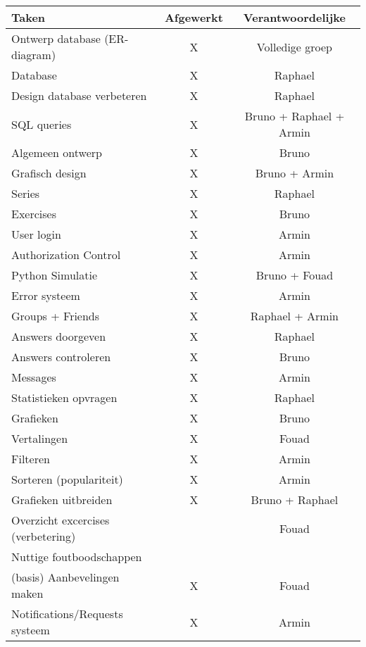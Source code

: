 \begin{tabular}{| l | c | c |}
    \hline
    Taken   &   Afgewerkt   &   Verantwoordelijke \\
    \hline \hline
    Ontwerp database (ER-diagram)   &   X   &   Volledige groep \\
    Database                &   X   &   Raphael \\
    Design database verbeteren  &   X   &   Raphael \\
    SQL queries             &   X   &   Bruno + Raphael + Armin \\
    Algemeen ontwerp        &   X   &   Bruno   \\
    Grafisch design         &   X   &   Bruno + Armin  \\
    Series                  &   X   &   Raphael \\
    Exercises              &   X   &   Bruno   \\
    User login              &   X   &   Armin   \\
    Authorization Control   &   X   &   Armin   \\
    Python Simulatie        &   X   &   Bruno + Fouad   \\
    Error systeem           &   X   &   Armin \\
    Groups + Friends        &   X   &   Raphael + Armin    \\
    Answers doorgeven       &   X   &   Raphael \\
    Answers controleren     &   X   &   Bruno   \\
    Messages                &   X   &   Armin   \\
    Statistieken opvragen   &   X   &   Raphael \\
    Grafieken               &   X   &   Bruno   \\
    Vertalingen             &   X   &   Fouad   \\
    Filteren                &   X   &   Armin   \\
    Sorteren (populariteit) &   X   &   Armin   \\
    Grafieken uitbreiden    &   X   &   Bruno + Raphael \\
    Overzicht excercises (verbetering)  &       &   Fouad   \\
    Nuttige foutboodschappen    &       &       \\
    (basis) Aanbevelingen maken &   X   & Fouad \\
    Notifications/Requests systeem &  X  & Armin \\

\end{tabular}
